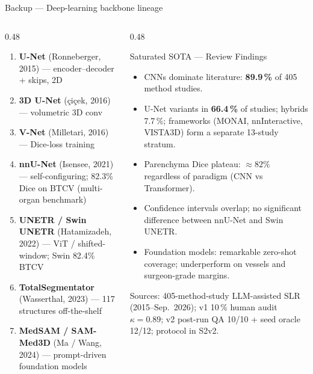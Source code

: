 \documentclass[aspectratio=169,11pt,xcolor=table]{beamer}
\begin{document}
\begin{frame}{Backup --- Deep-learning backbone lineage}
\footnotesize
\begin{columns}[T]
\begin{column}{0.48\linewidth}
\scriptsize
\begin{enumerate}
\setlength\itemsep{0pt}
\setlength\parskip{0pt}
\setlength\parsep{0pt}
\item \textbf{U-Net} (Ronneberger, 2015) --- encoder--decoder + skips, 2D
\item \textbf{3D U-Net} (\c{c}i\c{c}ek, 2016) --- volumetric 3D conv
\item \textbf{V-Net} (Milletari, 2016) --- Dice-loss training
\item \textbf{nnU-Net} (Isensee, 2021) --- self-configuring; \alert{82.3\% Dice} on BTCV (multi-organ benchmark)
\item \textbf{UNETR / Swin UNETR} (Hatamizadeh, 2022) --- ViT / shifted-window; Swin \alert{82.4\%} BTCV
\item \textbf{TotalSegmentator} (Wasserthal, 2023) --- 117 structures off-the-shelf
\item \textbf{MedSAM / SAM-Med3D} (Ma / Wang, 2024) --- prompt-driven foundation models
\end{enumerate}
\end{column}
\begin{column}{0.48\linewidth}
\begin{block}{Saturated SOTA --- Review Findings}
\scriptsize
\begin{itemize}
\setlength\itemsep{4pt}
\item CNNs dominate literature: \alert{\textbf{89.9\,\%}} of 405 method studies.
\item U-Net variants in \alert{\textbf{66.4\,\%}} of studies; hybrids 7.7\,\%; frameworks (MONAI, nnInteractive, VISTA3D) form a separate 13-study stratum.
\item Parenchyma Dice plateau: \alert{$\approx 82\%$} regardless of paradigm (CNN vs Transformer).
\item Confidence intervals overlap; no significant difference between nnU-Net and Swin UNETR.
\item Foundation models: remarkable zero-shot coverage; underperform on vessels and surgeon-grade margins.
\end{itemize}
\end{block}
\vspace{0.15cm}
\scriptsize\color{gray}Sources: 405-method-study LLM-assisted SLR (2015--Sep.~2026); v1 10\,\% human audit $\kappa = 0.89$; v2 post-run QA 10/10 + seed oracle 12/12; protocol in S2v2.
\end{column}
\end{columns}
\end{frame}
\end{document}
